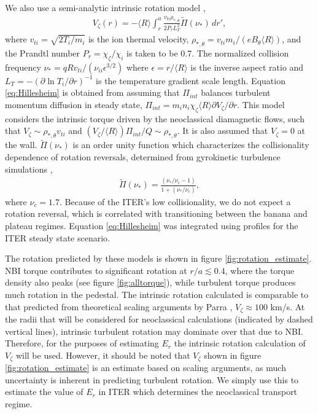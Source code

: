 \documentclass{article}
\numberwithin{figure}{section}
\numberwithin{equation}{section}
\begin{document}
We also use a semi-analytic intrinsic rotation model \cite{Hillesheim2015},
\begin{gather}
V_{\zeta}(r) = - \langle R \rangle \int_{r}^a \frac{v_{ti} \rho_{*,\theta}} {2 P_r L_T^2} \widetilde{\Pi} (\nu_*) \, d r',
\label{eq:Hillesheim}
\end{gather} 
where $v_{ti} = \sqrt{2T_i/m_i}$ is the ion thermal velocity, $\rho_{*,\theta} = v_{ti} m_i/(e B_{\theta} \langle R \rangle) $, and the Prandtl number $P_r = \chi_{\zeta}/\chi_i$ is taken to be 0.7. The normalized collision frequency $\nu_* = q R v_{ti}/(\nu_{ii} \epsilon^{3/2})$ where $\epsilon = r/\langle R \rangle$ is the inverse aspect ratio and $L_T = - \left( \partial \ln T_i/ \partial r \right)^{-1}$ is the temperature gradient scale length. Equation \ref{eq:Hillesheim} is obtained from assuming that $\Pi_{int}$ balances turbulent momentum diffusion in steady state, $\Pi_{int} = m_i n_i \chi_{\zeta} \langle R \rangle \partial V_{\zeta}/\partial r$. This model considers the intrinsic torque driven by the neoclassical diamagnetic flows, such that $V_{\zeta} \sim \rho_{*,\theta} v_{ti}$ and $(V_{\zeta}/\langle R \rangle) \Pi_{int}/Q \sim \rho_{*, \theta}$. It is also assumed that $V_{\zeta} = 0$ at the wall. %
$\widetilde{\Pi} (\nu_*)$ is an order unity function which characterizes the collisionality dependence of rotation reversals, determined from gyrokinetic turbulence simulations \cite{Barnes2013},
\begin{gather}
\widetilde{\Pi} (\nu_*) = \frac{(\nu_*/\nu_c -1)}{1 + (\nu_*/\nu_c)},
\end{gather}
where $\nu_c = 1.7$. Because of the ITER's low collisionality, we do not expect a rotation reversal, which is correlated with transitioning between the banana and plateau regimes. Equation \ref{eq:Hillesheim} was integrated using profiles for the ITER steady state scenario. 

The rotation predicted by these models is shown in figure \ref{fig:rotation_estimate}. NBI torque contributes to significant rotation at $r/a \lesssim 0.4$, where the torque density also peaks (see figure \ref{fig:alltorque}), while turbulent torque produces much rotation in the pedestal.  The intrinsic rotation calculated is comparable to that predicted from theoretical scaling arguments by Parra  \cite{Parra2012}, $V_{\zeta} \approx 100$ km/s. At the radii that will be considered for neoclassical calculations (indicated by dashed vertical lines), intrinsic turbulent rotation may dominate over that due to NBI. Therefore, for the purposes of estimating $E_r$ the intrinsic rotation calculation of $V_{\zeta}$ will be used. However, it should be noted that $V_{\zeta}$ shown in figure \ref{fig:rotation_estimate} is an estimate based on scaling arguments, as much uncertainty is inherent in predicting turbulent rotation. We simply use this to estimate the value of $E_r$ in ITER which determines the neoclassical transport regime.  
\FloatBarrier
\end{document}
